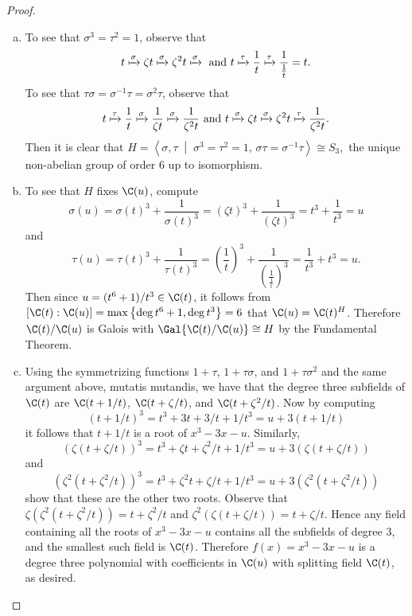 \documentclass[10pt]{amsart}
\begin{document}
\begin{thm}
  \begin{proof}
    \begin{enumerate}[(a)]
    \item
      To see that $\sigma^3 = \tau^2 = 1$, observe that 
      $$t \xmapsto{\sigma} \zeta t \xmapsto{\sigma} \zeta^2t \xmapsto{\sigma}\ \text{and}\ t \xmapsto{\tau} \frac{1}{t} \xmapsto{\tau} \frac{1}{\frac{1}{t}} = t.$$
      To see that $\tau\sigma = \sigma^{-1}\tau = \sigma^2\tau$, observe that
      $$t \xmapsto{\tau} \frac{1}{t} \xmapsto{\sigma} \frac{1}{\zeta t} \xmapsto{\sigma} \frac{1}{\zeta^2t}\ \text{and}\ t \xmapsto{\sigma} \zeta t \xmapsto{\sigma} \zeta^2t \xmapsto{\tau} \frac{1}{\zeta^2t}.$$
      Then it is clear that $H = \left< \sigma, \tau \;\middle\vert\; \sigma^3 = \tau^2 = 1,\, \sigma \tau = \sigma^{-1}\tau \right> \cong S_3,$ the unique non-abelian group of order 6 up to isomorphism.
    \item
      To see that $H$ fixes $\C(u)$, compute
      $$\sigma(u) = \sigma(t)^3 + \frac{1}{\sigma(t)^3} = (\zeta t)^3 + \frac{1}{(\zeta t)^3} = t^3 + \frac{1}{t^3} = u$$
      and
      $$\tau(u) = \tau(t)^3 + \frac{1}{\tau(t)^3} = \left(\frac{1}{t}\right)^3 + \frac{1}{\left(\frac{1}{\frac{1}{t}}\right)^3} = \frac{1}{t^3} + {t^3} = u.$$
      Then since $u = (t^6 + 1)/t^3 \in \C(t)$, it follows from $[\C(t) : \C(u)] = \max\left\{\deg{t^6 + 1}, \deg{t^3}\right\} = 6$ that $\C(u) = \C(t)^H$.
      Therefore $\C(t)/\C(u)$ is Galois with $\Gal{\C(t)/\C(u)} \cong H$ by the Fundamental Theorem.
    \item
      Using the symmetrizing functions $1 + \tau$, $1 + \tau\sigma$, and $1 + \tau\sigma^2$ and the same argument above, mutatis mutandis, we have that the degree three subfields of $\C(t)$ are $\C(t + 1/t)$, $\C(t + \zeta/t)$, and $\C(t + \zeta^2/t)$.
      Now by computing 
      $$(t + 1/t)^3 = t^3 + 3t + 3/t + 1/t^3 = u + 3(t + 1/t)$$
      it follows that $t + 1/t$ is a root of $x^3 - 3x - u$.
      Similarly, 
      $$(\zeta(t + \zeta/t))^3 = t^3 + \zeta t + \zeta^2/t + 1/t^3 = u + 3(\zeta(t + \zeta/t))$$
      and
      $$(\zeta^2(t + \zeta^2/t))^3 = t^3 + \zeta^2 t + \zeta/t + 1/t^3 = u + 3(\zeta^2(t + \zeta^2/t))$$
      show that these are the other two roots.
      Observe that $\zeta(\zeta^2(t + \zeta^2/t)) = t + \zeta^2/t$ and $\zeta^2(\zeta(t + \zeta/t)) = t + \zeta/t$.
      Hence any field containing all the roots of $x^3 - 3x - u$ contains all the subfields of degree 3, and the smallest such field is $\C(t)$.
      Therefore $f(x) = x^3 - 3x - u$ is a degree three polynomial with coefficients in $\C(u)$ with splitting field $\C(t)$, as desired.
    \end{enumerate}
  \end{proof}
\end{thm}
\end{document}
